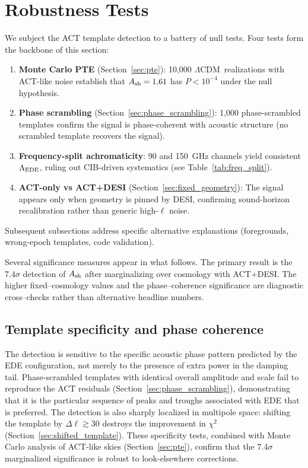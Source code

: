\documentclass[twocolumn,showpacs,preprintnumbers,amsmath,amssymb,prd]{revtex4-2}
\newcommand{\lcdm}{$\Lambda$CDM}
\begin{document}
\section{Robustness Tests}
\label{sec:robust}

We subject the ACT template detection to a battery of null tests. Four 
tests form the backbone of this section:
\begin{enumerate}
\item \textbf{Monte Carlo PTE} (Section~\ref{sec:pte}): 10,000 \lcdm\ 
realizations with ACT-like noise establish that $A_{\rm sh} = 1.61$ has 
$P < 10^{-4}$ under the null hypothesis.
\item \textbf{Phase scrambling} (Section~\ref{sec:phase_scrambling}): 
1,000 phase-scrambled templates confirm the signal is phase-coherent 
with acoustic structure (no scrambled template recovers the signal).
\item \textbf{Frequency-split achromaticity}: 
90 and 150~GHz channels yield consistent $\Lambda_{\rm EDE}$, ruling out 
CIB-driven systematics (see Table~\ref{tab:freq_split}).
\item \textbf{ACT-only vs ACT+DESI} (Section~\ref{sec:fixed_geometry}): 
The signal appears only when geometry is pinned by DESI, confirming 
sound-horizon recalibration rather than generic high-$\ell$ noise.
\end{enumerate}
Subsequent subsections address specific alternative explanations 
(foregrounds, wrong-epoch templates, code validation).

Several significance measures appear in what follows. The primary result is the 7.4$\sigma$ 
detection of $A_{\rm sh}$ after marginalizing over cosmology with ACT+DESI. The higher 
fixed--cosmology values and the phase--coherence significance are diagnostic cross--checks 
rather than alternative headline numbers.

\subsection{Template specificity and phase coherence}

The detection is sensitive to the specific acoustic phase pattern predicted 
by the EDE configuration, not merely to the presence of extra power in the 
damping tail. Phase-scrambled templates with identical overall amplitude and 
scale fail to reproduce the ACT residuals (Section~\ref{sec:phase_scrambling}), 
demonstrating that it is the particular sequence of peaks and troughs 
associated with EDE that is preferred. The detection is also sharply 
localized in multipole space: shifting the template by $\Delta\ell \gtrsim 30$ 
destroys the improvement in $\chi^2$ (Section~\ref{sec:shifted_template}). 
These specificity tests, combined with Monte Carlo analysis of ACT-like skies 
(Section~\ref{sec:pte}), confirm that the 7.4$\sigma$ marginalized significance 
is robust to look-elsewhere corrections.
\end{document}
